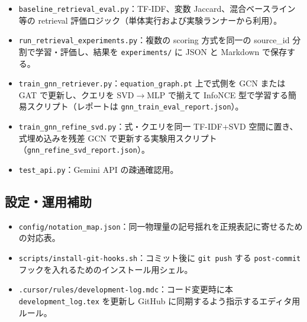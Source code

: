 \documentclass[11pt,a4paper]{jsarticle}
\begin{document}
\begin{itemize}[nosep]
  \item \texttt{baseline\_retrieval\_eval.py}：TF-IDF、変数 Jaccard、混合ベースライン等の retrieval 評価ロジック（単体実行および実験ランナーから利用）。
  \item \texttt{run\_retrieval\_experiments.py}：複数の scoring 方式を同一の source\_id 分割で学習・評価し、結果を \texttt{experiments/} に JSON と Markdown で保存する。
  \item \texttt{train\_gnn\_retriever.py}：\texttt{equation\_graph.pt} 上で式側を GCN または GAT で更新し、クエリを SVD$\to$MLP で揃えて InfoNCE 型で学習する簡易スクリプト（レポートは \texttt{gnn\_train\_eval\_report.json}）。
  \item \texttt{train\_gnn\_refine\_svd.py}：式・クエリを同一 TF-IDF+SVD 空間に置き、式埋め込みを残差 GCN で更新する実験用スクリプト（\texttt{gnn\_refine\_svd\_report.json}）。
  \item \texttt{test\_api.py}：Gemini API の疎通確認用。
\end{itemize}

\subsection{設定・運用補助}
\begin{itemize}[nosep]
  \item \texttt{config/notation\_map.json}：同一物理量の記号揺れを正規表記に寄せるための対応表。
  \item \texttt{scripts/install-git-hooks.sh}：コミット後に \texttt{git push} する \texttt{post-commit} フックを入れるためのインストール用シェル。
  \item \texttt{.cursor/rules/development-log.mdc}：コード変更時に本 \texttt{development\_log.tex} を更新し GitHub に同期するよう指示するエディタ用ルール。
\end{itemize}
\end{document}

